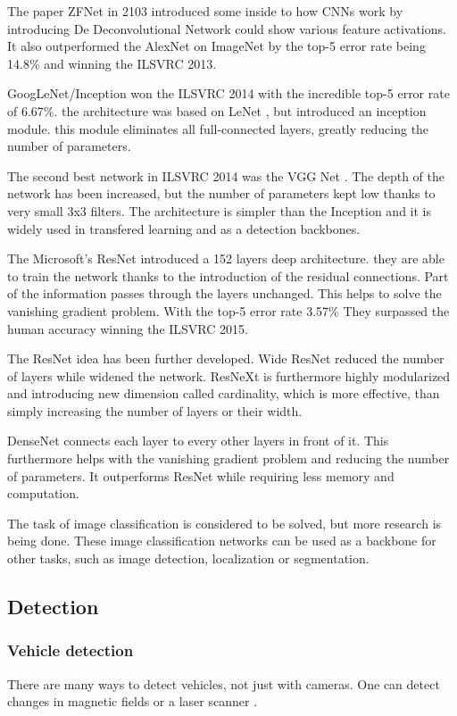 \documentclass[a4paper,12pt,titlepage]{article}
\numberwithin{figure}{section}
\begin{document}
The paper ZFNet \cite{zeiler2014visualizing} in 2103 introduced some inside to how CNNs work by introducing De Deconvolutional Network could show various feature activations. It also outperformed the AlexNet on ImageNet by the top-5 error rate being 14.8\% and winning the ILSVRC 2013.

GoogLeNet/Inception won the ILSVRC 2014 with the incredible top-5 error rate of 6.67\%. the architecture was based on LeNet \cite{lecun1998gradient}, but introduced an inception module. this module eliminates all full-connected layers, greatly reducing the number of parameters.

The second best network in ILSVRC 2014 was the VGG Net \cite{simonyan2014very}. The depth of the network has been increased, but the number of parameters kept low thanks to very small 3x3 filters. The architecture is simpler than the Inception and it is widely used in transfered learning and as a detection backbones.

The Microsoft's ResNet\cite{he2016deep} introduced a 152 layers deep architecture. they are able to train the network thanks to the introduction of the residual connections. Part of the information passes through the layers unchanged. This helps to solve the vanishing gradient problem. With the top-5 error rate 3.57\% They surpassed the human accuracy winning the ILSVRC 2015.

The ResNet idea has been further developed. Wide ResNet\cite{zagoruyko2016wide} reduced the number of layers while widened the network. ResNeXt \cite{xie2017aggregated} is furthermore highly modularized and introducing new dimension called cardinality, which is more effective, than simply increasing the number of layers or their width. 

DenseNet \cite{huang2017densely} connects each layer to every other layers in front of it. This furthermore helps with the vanishing gradient problem and reducing the number of parameters. It outperforms ResNet while requiring less memory and computation.

The task of image classification is considered to be solved, but more research is being done. These image classification networks can be used as a backbone for other tasks, such as image detection, localization or segmentation.

\subsection{Detection}
\subsubsection{Vehicle detection}
There are many ways to detect vehicles, not just with cameras. One can detect changes in magnetic fields \cite{daubaras2012vehicle, caruso1999vehicle} or a laser scanner \cite{gate2009fast}.
\end{document}
